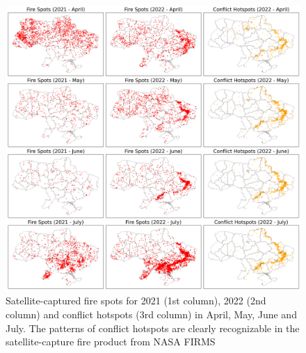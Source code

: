 \begin{figure}[tbh!]
    \centering
    \includegraphics[width=\textwidth]{figs/chap3/fig6.png}
    \caption[Analyzed conflict hotspots using satellite and ACLED data]{Satellite-captured fire spots for 2021 (1st column), 2022 (2nd column) and conflict hotspots (3rd column) in April, May, June and July. The patterns of conflict hotspots are clearly recognizable in the satellite-capture fire product from NASA FIRMS}
    \label{fig:chap3_fig6}
\end{figure}

